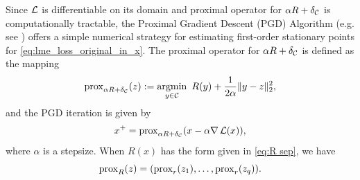 Since $\operatorname{\mathcal{L}}$ is differentiable on its domain and 
proximal operator
for $\alpha R + \delta_{\mathcal{C}}$ is 
computationally tractable, 
the Proximal Gradient Descent (PGD) Algorithm (e.g. see \cite{AB17}) offers a simple numerical
strategy for estimating first-order stationary points for 
\eqref{eq:lme_loss_original_in_x}.
%
The proximal operator for 
$\alpha R + \delta_{\mathcal{C}}$ is defined as the mapping
\[ %
    \prox_{\alpha R + \delta_{\CC}}(z) := \argmin_{y\in \CC}\ R(y) + \frac{1}{2\alpha}\|y - z\|_2^2 ,
\] %
and the PGD iteration is given by
\[
    x^+ = {\mathrm{prox}}_{\alpha R + \delta_{\mathcal{C}}}(x - \alpha \nabla \operatorname{\mathcal{L}}(x)),
\]
where $\alpha$ is a stepsize.
When $R(x)$ has the form given in \eqref{eq:R sep}, we have
\[
 {\mathrm{prox}}_{R}(z) = ({\mathrm{prox}}_r(z_1), \dots, {\mathrm{prox}}_r(z_q)) .
\]
